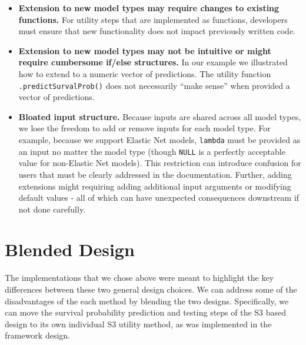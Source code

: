 \documentclass[
]{book}
\providecommand{\tightlist}{%
  \setlength{\itemsep}{0pt}\setlength{\parskip}{0pt}}
\begin{document}
\begin{itemize}
\begin{itemize}
    \begin{itemize}
    \tightlist
    \item
      \textbf{Extension to new model types may require changes to existing functions.}
      For utility steps that are implemented as functions, developers must ensure that new functionality does not impact previously written code.
    \item
      \textbf{Extension to new model types may not be intuitive or might require cumbersome if/else structures.}
      In our example we illustrated how to extend to a numeric vector of predictions. The utility function \texttt{.predictSurvalProb()} does not necessarily ``make sense'' when provided a vector of predictions.
    \item
      \textbf{Bloated input structure.}
      Because inputs are shared across all model types, we lose the freedom to add or remove inputs for each model type. For example, because we support Elastic Net models, \texttt{lambda} must be provided as an input no matter the model type (though \texttt{NULL} is a perfectly acceptable value for non-Elastic Net models). This restriction can introduce confusion for users that must be clearly addressed in the documentation. Further, adding extensions might requiring adding additional input arguments or modifying default values - all of which can have unexpected consequences downstream if not done carefully.
    \end{itemize}
  \end{itemize}
\end{itemize}

\hypertarget{blended-design}{%
\section{Blended Design}\label{blended-design}}

The implementations that we chose above were meant to highlight the key differences between these two general design choices. We can address some of the disadvantages of the each method by blending the two designs. Specifically, we can move the survival probability prediction and testing steps of the S3 based design to its own individual S3 utility method, as was implemented in the framework design.
\end{document}
